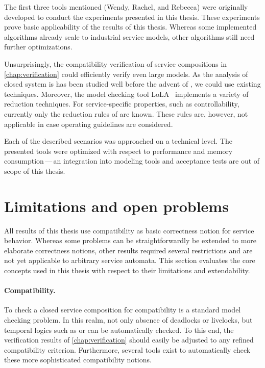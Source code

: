 The first three tools mentioned (Wendy, Rachel, and Rebecca) were originally developed to conduct the experiments presented in this thesis. These experiments prove basic applicability of the results of this thesis. Whereas some implemented algorithms already scale to industrial service models, other algorithms still need further optimizations.

Unsurprisingly, the compatibility verification of service compositions in \autoref{chap:verification} could efficiently verify even large models. As the analysis of closed system is has been studied well before the advent of , we could use existing techniques. Moreover, the model checking tool LoLA~\cite{Wolf_2007_icatpn} implements a variety of reduction techniques. For service-specific properties, such as controllability, currently only the reduction rules of \citet{Weinberg_2008_wsfm} are known. These rules are, however, not applicable in case operating guidelines are considered.

Each of the described scenarios was approached on a technical level. The presented tools were optimized with respect to performance and memory consumption\,---\,an integration into modeling tools and acceptance tests are out of scope of this thesis.





\section{Limitations and open problems}
\label{limitations}

All results of this thesis use compatibility as basic correctness notion for service behavior. Whereas some problems can be straightforwardly be extended to more elaborate correctness notions, other results required several restrictions and are not yet applicable to arbitrary service automata. This section evaluates the core concepts used in this thesis with respect to their limitations and extendability.


\paragraph{Compatibility.}

To check a closed service composition for compatibility is a standard model checking problem. In this realm, not only absence of deadlocks or livelocks, but temporal logics such as  or  can be automatically checked. To this end, the verification results of \autoref{chap:verification} should easily be adjusted to any refined compatibility criterion. Furthermore, several tools exist to automatically check these more sophisticated compatibility notions.


